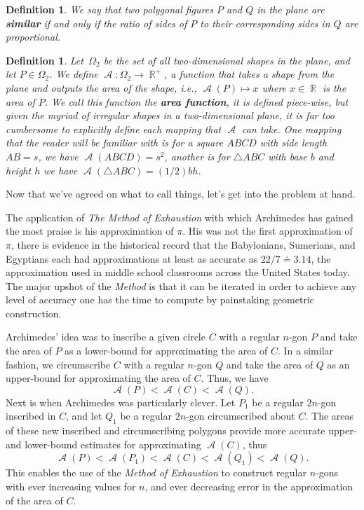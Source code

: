 \documentclass[letterpaper, 12pt]{amsart}
\DeclareMathOperator{\R}{\mathbb{R}}
\DeclareMathOperator{\A}{\mathcal{A}}
\newtheorem{defn}[thm]{Definition}
\theoremstyle{definition}  %
\begin{document}
		\begin{defn}
		\label{defn:sim_polygons}
		We say that two polygonal figures $P$ and $Q$ in the plane are \textbf{similar} if and only if the ratio of sides of $P$ to their corresponding sides in $Q$ are proportional.
		\end{defn}

		\begin{defn}
		\label{defn:area_function}
		Let $\, \Omega_{2}$ be the set of all two-dimensional shapes in the plane, and let $P \in \Omega_{2}$.
		We define $\A : \Omega_{2} \to \R^{+}$, a function that takes a shape from the plane and outputs the area of the shape, i.e., $\A(P) \mapsto x$ where $x \in \R$ is the area of $P$.
		We call this function the \textbf{area function}, it is defined piece-wise, but given the myriad of irregular shapes in a two-dimensional plane, it is far too cumbersome to explicitly define each mapping that $\A$ can take.
		One mapping that the reader will be familiar with is for a square $ABCD$ with side length $AB = s$, we have $\A(ABCD) = s^{2}$, another is for $\triangle ABC$ with base $b$ and height $h$ we have $\A(\triangle ABC) = (1/2)bh$.
		\end{defn}
		Now that we've agreed on what to call things, let's get into the problem at hand.

		The application of \textit{The Method of Exhaustion} with which Archimedes has gained the most praise is his approximation of $\pi$.
		His was not the first approximation of $\pi$, there is evidence in the historical record that the Babylonians, Sumerians, and Egyptians each had approximations at least as accurate as $22/7 \doteq 3.14$, the approximation used in middle school classrooms across the United States today.
		The major upshot of the \textit{Method} is that it can be iterated in order to achieve any level of accuracy one has the time to compute by painstaking geometric construction.

		Archimedes' idea was to inscribe a given circle $C$ with a regular $n$-gon $P$ and take the area of $P$ as a lower-bound for approximating the area of $C$.
		In a similar fashion, we circumscribe $C$ with a regular $n$-gon $Q$ and take the area of $Q$ as an upper-bound for approximating the area of $C$.
		Thus, we have $$\A(P) < \A(C) < \A(Q).$$
		Next is when Archimedes was particularly clever.
		Let $P_{1}$ be a regular $2n$-gon inscribed in $C$, and let $Q_{1}$ be a regular $2n$-gon circumscribed about $C$.
		The areas of these new inscribed and circumscribing polygons provide more accurate upper- and lower-bound estimates for approximating $\A(C)$, thus $$\A(P) < \A(P_{1}) < \A(C) < \A(Q_{1}) < \A(Q).$$
		This enables the use of the \textit{Method of Exhaustion} to construct regular $n$-gons with ever increasing values for $n$, and ever decreasing error in the approximation of the area of $C$.
\end{document}
